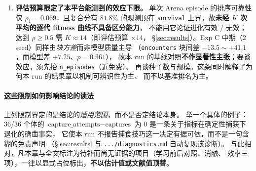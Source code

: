 \begin{enumerate}
  (ii)~该轴读数须\textbf{逐 seed 居中}（基线 = 该 seed 分层集读数中位数）：
  不同 founder 背景使各 seed 的整体水平平移约 $8$ 个神经元，而基因型效应仅约 $1$，
  故\textbf{跨 seed（或跨批次）直接池化会得到 $\mathrm{pen}\equiv0.5$ 的假象}。
  这条限定同时界定了适用范围：$\mathrm{pen}$ 是\emph{群体内}对比量。
  观测阈值 $\theta_N^{\mathrm{obs}}$ 的数值仍待\textbf{人工签署}，
  故 \S\ref{sec:results} 的该表是草案。
  \item \textbf{评估预算限定了本平台能测到的效应下限。}
  单次 Arena episode 的排序可靠性仅 $\rho_1 = 0.069$，且复合分有 $81.8\%$ 的观测顶在
  \texttt{survival} 上界，故\textbf{未经 $K$ 次平均的逐代 fitness 曲线不具备区分能力}，
  不能用它论证进化有效 / 无效；达到 $\rho\ge0.5$ 需 $K\approx14$（即评估预算 $\times14$，
  \S\ref{sec:results}）。Exp C 中期（2 seed）同样由\emph{块方差}而非模型质量主导
  （\texttt{encounters} 块间差 $-13.5\sim+41.1$，而模型差 $+7.25$、$p=0.361$），
  故本 run 的基线对照\textbf{不作显著性主张}；要谈效应，须先抬 \texttt{n\_episodes}（近免费）、
  再谈种子数与规模。这条同时解释了为何本 run 的结果章以机制可辨识性为主、
  而不以基准排名为主。
\end{enumerate}

\paragraph{这些限制如何影响结论的读法}
上列限制界定的是结论的\emph{适用范围}，而不是否定结论本身。
举一个具体的例子：36/36 个体的
$\text{capture\_attempts}-\text{captures}$ 为 $0$ 是一条关于指标在确定性捕获下退化的确凿事实，
它使本 run 不报告捕食技巧这一决定有据可依，而不是一句含糊的免责声明
（\S\ref{sec:results} 与 \texttt{.../diagnostics.md} 自动复现该诊断）。
与此相对，凡本章与全文标注为待补而尚无证据的项目（学习前后对照、消融、
效率三项），一律以显式占位标出，\textbf{不以估计值或文献值顶替}。
